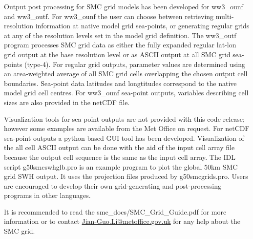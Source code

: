 Output post processing for SMC grid models has been developed for
ww3\_ounf and ww3\_outf. For ww3\_ounf the user can choose between
retrieving multi-resolution information at native model grid sea-points,
or generating regular grids at any of the resolution levels set in
the model grid definition. The ww3\_outf program processes SMC grid data
as either the fully expanded regular lat-lon grid output at the base
resolution level or as ASCII output at all SMC grid sea-points (type-4).
For regular grid outputs, parameter values are determined
using an area-weighted average of all SMC grid cells overlapping the chosen
output cell boundaries. Sea-point data latitudes and longtitudes 
correspond to the native model grid cell centres. For ww3\_ounf
sea-point outputs, variables describing cell sizes are also provided
in the netCDF file.

Visualization tools for sea-point outputs are not provided with this
code release; however some examples are available from the Met Office
on request. For netCDF sea-point outputs a python based GUI tool has
been developed. Visualization of the all cell ASCII output can be done
with the aid of the input cell array file because the output cell 
sequence is the same as the input cell array. The IDL script 
g50smcswhglb.pro is an example program to plot the global 50km SMC grid
SWH output. It uses the projection files produced by g50smcgrids.pro. 
Users are encouraged to develop their own grid-generating and 
post-processing programs in other languages.

It is recommended to read the smc\_docs/SMC\_Grid\_Guide.pdf for
more information or to contact \url{Jian-Guo.Li@metoffice.gov.uk} 
for any help about the SMC grid.

